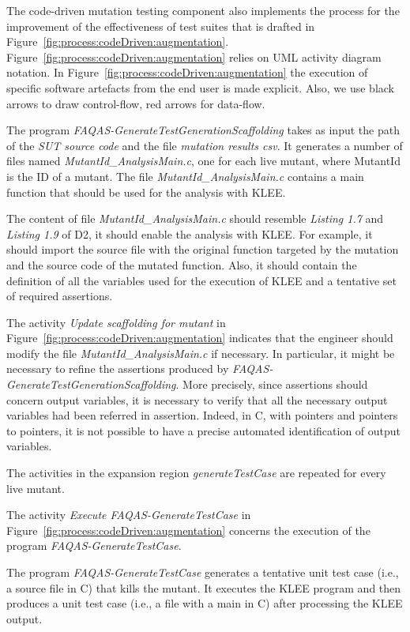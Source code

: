 The code-driven mutation testing component also implements the process for the improvement of the effectiveness of test suites that is drafted in Figure~\ref{fig:process:codeDriven:augmentation}. Figure~\ref{fig:process:codeDriven:augmentation} relies on UML activity diagram notation. In Figure~\ref{fig:process:codeDriven:augmentation} the execution of specific software artefacts from the end user is made explicit. Also, we use black arrows to draw control-flow, red arrows for data-flow.

The program \emph{FAQAS-GenerateTestGenerationScaffolding} takes as input the path of the \emph{SUT source code} and the file \emph{mutation results csv}. It generates a number of files named \emph{MutantId\_AnalysisMain.c}, one for each live mutant, where MutantId is the ID of a mutant. The file \emph{MutantId\_AnalysisMain.c} contains a main function that should be used for the analysis with KLEE. 

The content of file \emph{MutantId\_AnalysisMain.c} should resemble \emph{Listing 1.7} and \emph{Listing 1.9} of D2, it should enable the analysis with KLEE. For example, it should import the source file with the original function targeted by the mutation and the source code of the mutated function. Also, it should contain the definition of all the variables used for the execution of KLEE and a tentative set of required assertions.

The activity \emph{Update scaffolding for mutant} in Figure~\ref{fig:process:codeDriven:augmentation} indicates that the engineer should modify the file  \emph{MutantId\_AnalysisMain.c} if necessary. In particular, it might be necessary to refine the assertions produced by \emph{FAQAS-GenerateTestGenerationScaffolding}. More precisely, since assertions should concern output variables, it is necessary to verify that all the necessary output variables had been referred in assertion. Indeed, in C, with pointers and pointers to pointers, it is not possible to have a precise automated identification of output variables.

The activities in the expansion region \emph{generateTestCase} are repeated for every live mutant.

The activity \emph{Execute FAQAS-GenerateTestCase} in Figure~\ref{fig:process:codeDriven:augmentation} concerns the execution of the program \emph{FAQAS-GenerateTestCase}.

The program \emph{FAQAS-GenerateTestCase} generates a tentative unit test case (i.e., a source file in C) that kills the mutant. It executes the KLEE program and then produces a unit test case (i.e., a file with a main in C) after processing the KLEE output.


